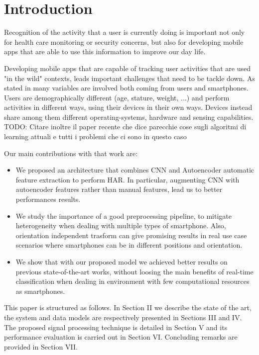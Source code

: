 
\section{Introduction}
\label{sec:introduction}
Recognition of the activity that a user is currently doing is important not only for health care monitoring or security concerns, but also for developing mobile apps that are able to use this information to improve our day life.

Developing mobile apps that are capable of tracking user activities that are used "in the wild" contexts, leads important challenges that need to be tackle down. As stated in \cite{blunck2013heterogeneity} many variables are involved both coming from users and smartphones. Users are demographically different (age, stature, weight, ...) and perform activities in different ways, using their devices in their own ways. Devices instead share among them different operating-systems, hardware and sensing capabilities.
TODO: Citare inoltre il paper \cite{chen2020deep} recente che dice parecchie cose sugli algoritmi di learning attuali e tutti i problemi che ci sono in questo caso 

Our main contributions with that work are:
\begin{itemize}
	\item We proposed an architecture that combines CNN and Autoencoder automatic feature extraction to perform HAR. In particular, augmenting CNN with autoencoder features rather than manual features, lead us to better performances results.
	\item We study the importance of a good preprocessing pipeline, to mitigate heterogeneity when dealing with multiple types of smartphone. Also, orientation independent trasform can give promising results in real use case scenarios where smartphones can be in different positions and orientation.
	\item We show that with our proposed model we achieved better results on previous state-of-the-art works, without loosing the main benefits of real-time classification when dealing in environment with few computational resources as smartphones.
\end{itemize}

This paper is structured as follows. In Section II we describe the state of the art, the system and data models are respectively presented in Sections III and IV. The proposed signal processing technique is detailed in Section V and its performance evaluation is carried out in Section VI. Concluding remarks are provided in Section VII. 






